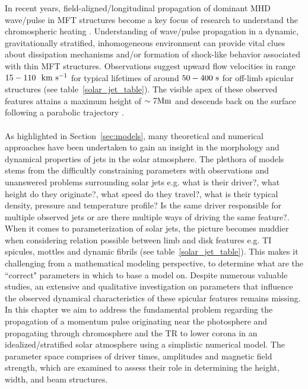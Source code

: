 \documentclass[12pt]{ociamthesis}
\newcommand{\kms}{~\rm{km ~s^{-1}}}
\newcommand{\np}{\\ \\}
\begin{document}
%
In recent years, field-aligned/longitudinal propagation of dominant MHD wave/pulse in MFT structures become a key focus of research to understand the chromospheric heating \citep{Narain1990, Zaqarashvili_2009SSRv, Jess2015}. Understanding of wave/pulse propagation in a dynamic, gravitationally stratified, inhomogeneous environment can provide vital clues about dissipation mechanisms and/or formation of shock-like behavior associated with thin MFT structures. Observations suggest upward flow velocities in range $15-110 ~\kms$ for typical lifetimes of around $50-400~\rm{s}$ for off-limb spicular structures (see table~\ref{solar_jet_table}). The visible apex of these observed features attains a maximum height of $\sim 7 \rm{Mm}$ and descends back on the surface following a parabolic trajectory \citep{Pereira2012,Pereira2016ApJ82465P}. \np
%
As highlighted in Section~\ref{sec:models}, many theoretical and numerical approaches have been undertaken to gain an insight in the morphology and dynamical properties of jets in the solar atmosphere. The plethora of models stems from the difficultly constraining parameters with observations and unanswered problems surrounding solar jets e.g. what is their driver?, what height do they originate?, what speed do they travel?, what is their typical density, pressure and temperature profile? Is the same driver responsible for multiple observed jets or are there multiple ways of driving the same feature?. When it comes to parameterization of solar jets, the picture becomes muddier when considering relation possible between limb and disk features e.g. TI spicules, mottles and dynamic fibrils (see table~\ref{solar_jet_table}). This makes it challenging from a mathematical modeling perspective, to determine what are the ``correct" parameters in which to base a model on. Despite numerous valuable studies, an extensive and qualitative investigation on parameters that influence the observed dynamical characteristics of these spicular features remains missing. In this chapter we aim to address the fundamental problem regarding the propagation of a momentum pulse originating near the photosphere and propagating through chromosphere and the TR to lower corona in an idealized/stratified solar atmosphere using a simplistic numerical model. The parameter space comprises of driver times, amplitudes and magnetic field strength, which are examined to assess their role in determining the height, width, and beam structures.
\end{document}

